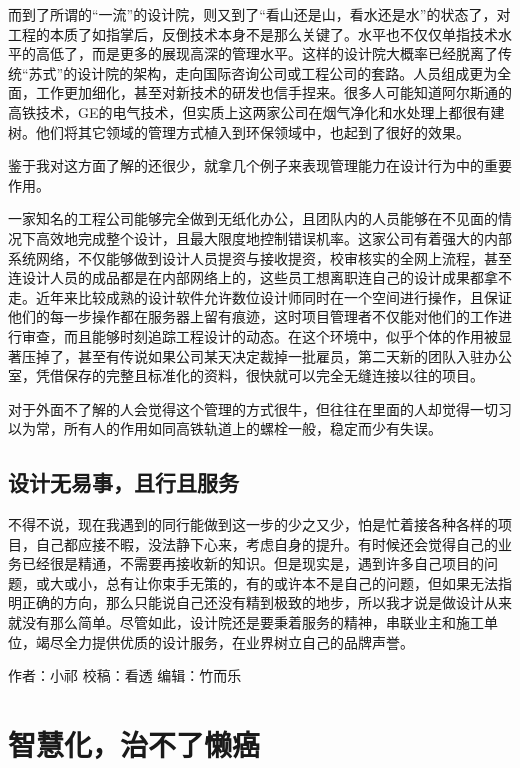 \documentclass[
]{book}
\begin{document}
而到了所谓的``一流''的设计院，则又到了``看山还是山，看水还是水''的状态了，对工程的本质了如指掌后，反倒技术本身不是那么关键了。水平也不仅仅单指技术水平的高低了，而是更多的展现高深的管理水平。这样的设计院大概率已经脱离了传统``苏式''的设计院的架构，走向国际咨询公司或工程公司的套路。人员组成更为全面，工作更加细化，甚至对新技术的研发也信手捏来。很多人可能知道阿尔斯通的高铁技术，GE的电气技术，但实质上这两家公司在烟气净化和水处理上都很有建树。他们将其它领域的管理方式植入到环保领域中，也起到了很好的效果。

鉴于我对这方面了解的还很少，就拿几个例子来表现管理能力在设计行为中的重要作用。

一家知名的工程公司能够完全做到无纸化办公，且团队内的人员能够在不见面的情况下高效地完成整个设计，且最大限度地控制错误机率。这家公司有着强大的内部系统网络，不仅能够做到设计人员提资与接收提资，校审核实的全网上流程，甚至连设计人员的成品都是在内部网络上的，这些员工想离职连自己的设计成果都拿不走。近年来比较成熟的设计软件允许数位设计师同时在一个空间进行操作，且保证他们的每一步操作都在服务器上留有痕迹，这时项目管理者不仅能对他们的工作进行审查，而且能够时刻追踪工程设计的动态。在这个环境中，似乎个体的作用被显著压掉了，甚至有传说如果公司某天决定裁掉一批雇员，第二天新的团队入驻办公室，凭借保存的完整且标准化的资料，很快就可以完全无缝连接以往的项目。

对于外面不了解的人会觉得这个管理的方式很牛，但往往在里面的人却觉得一切习以为常，所有人的作用如同高铁轨道上的螺栓一般，稳定而少有失误。

\hypertarget{ux8bbeux8ba1ux65e0ux6613ux4e8bux4e14ux884cux4e14ux670dux52a1}{%
\subsection{设计无易事，且行且服务}\label{ux8bbeux8ba1ux65e0ux6613ux4e8bux4e14ux884cux4e14ux670dux52a1}}

不得不说，现在我遇到的同行能做到这一步的少之又少，怕是忙着接各种各样的项目，自己都应接不暇，没法静下心来，考虑自身的提升。有时候还会觉得自己的业务已经很是精通，不需要再接收新的知识。但是现实是，遇到许多自己项目的问题，或大或小，总有让你束手无策的，有的或许本不是自己的问题，但如果无法指明正确的方向，那么只能说自己还没有精到极致的地步，所以我才说是做设计从来就没有那么简单。尽管如此，设计院还是要秉着服务的精神，串联业主和施工单位，竭尽全力提供优质的设计服务，在业界树立自己的品牌声誉。

作者：小祁
校稿：看透
编辑：竹而乐

\hypertarget{ux667aux6167ux5316ux6cbbux4e0dux4e86ux61d2ux764c}{%
\section{智慧化，治不了懒癌}\label{ux667aux6167ux5316ux6cbbux4e0dux4e86ux61d2ux764c}}
\end{document}
